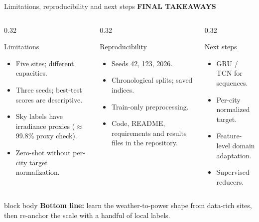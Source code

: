 \documentclass[aspectratio=169,11pt]{beamer}
\newcommand{\sectiontag}[1]{{\footnotesize\usebeamercolor[fg]{structure}\textbf{#1}}\par\vspace{0.10cm}}
\begin{document}
\begin{frame}{Limitations, reproducibility and next steps}
\sectiontag{FINAL TAKEAWAYS}
\begin{columns}[T,totalwidth=\textwidth]
\begin{column}{0.32\textwidth}
\begin{block}{Limitations}
\scriptsize\begin{itemize}
\setlength\itemsep{0.08em}
\item Five sites; different capacities.
\item Three seeds; best-test scores are descriptive.
\item Sky labels have irradiance proxies ($\approx$99.8\% proxy check).
\item Zero-shot without per-city target normalization.
\end{itemize}
\end{block}
\end{column}
\begin{column}{0.32\textwidth}
\begin{block}{Reproducibility}
\scriptsize\begin{itemize}
\setlength\itemsep{0.08em}
\item Seeds 42, 123, 2026.
\item Chronological splits; saved indices.
\item Train-only preprocessing.
\item Code, README, requirements and results files in the repository.
\end{itemize}
\end{block}
\end{column}
\begin{column}{0.32\textwidth}
\begin{block}{Next steps}
\scriptsize\begin{itemize}
\setlength\itemsep{0.08em}
\item GRU / TCN for sequences.
\item Per-city normalized target.
\item Feature-level domain adaptation.
\item Supervised reducers.
\end{itemize}
\end{block}
\end{column}
\end{columns}
\vspace{0.15cm}
\begin{beamercolorbox}[sep=0.13cm,wd=\linewidth]{block body}
\small\textbf{Bottom line:} learn the weather-to-power shape from data-rich sites, then re-anchor the scale with a handful of local labels.
\end{beamercolorbox}
\end{frame}
\end{document}
